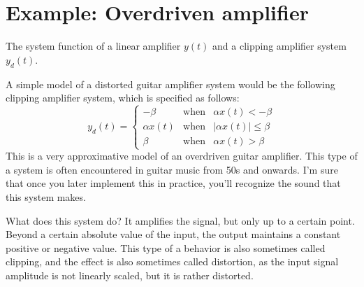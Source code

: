 \section{Example: Overdriven amplifier}
\label{dist_effect}

\begin{marginfigure}
\caption{The system function of a linear amplifier $y(t)$ and a clipping amplifier system $y_d(t)$.}
\end{marginfigure}

A simple model of a distorted guitar amplifier system would be the
following clipping amplifier system, which is specified as follows:
\begin{equation}
y_d(t) = \left\{
  \begin{array}{rcr}
    -\beta & \mathrm{when} & \alpha x(t)<-\beta \\
    \alpha x(t) & \mathrm{when} & |\alpha x(t)| \le \beta \\
    \beta & \mathrm{when} & \alpha x(t)>\beta 
\end{array}
\right.
\label{clipamp}
\end{equation}
This is a very approximative model of an overdriven guitar
amplifier. This type of a system is often encountered in guitar music
from 50s and onwards. I'm sure that once you later implement this in
practice, you'll recognize the sound that this system makes.

What does this system do? It amplifies the signal, but only up to a
certain point. Beyond a certain absolute value of the input, the
output maintains a constant positive or negative value.  This type of
a behavior is also sometimes called clipping, and the effect is
also sometimes called distortion, as the input signal amplitude is not
linearly scaled, but it is rather distorted.

